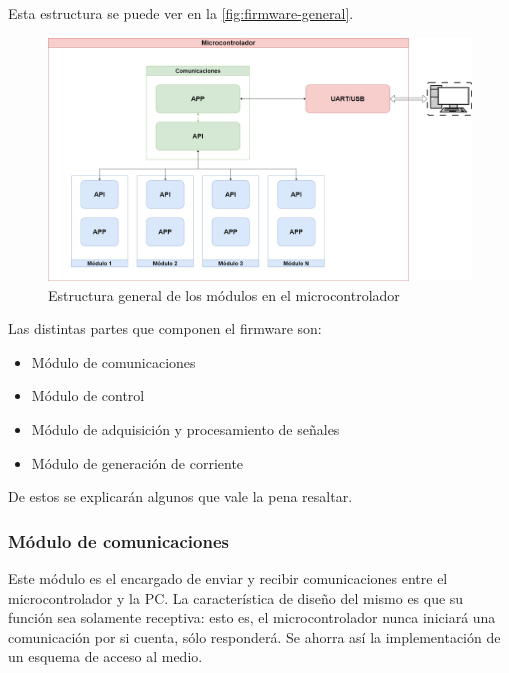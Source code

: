 \documentclass[titlepage, 12pt]{article}
\begin{document}
Esta estructura se puede ver en la \autoref{fig:firmware-general}.

    \begin{figure}[!htbp]
        \centering
        \includegraphics[scale=0.23]{diagrams/firmware-general.png}
        \caption{Estructura general de los módulos en el microcontrolador}
        \label{fig:firmware-general}
    \end{figure}


Las distintas partes que componen el firmware son:
    \begin{itemize}
        \item Módulo de comunicaciones
        \item Módulo de control
        \item Módulo de adquisición y procesamiento de señales
        \item Módulo de generación de corriente
    \end{itemize}

De estos se explicarán algunos que vale la pena resaltar.

\subsubsection{Módulo de comunicaciones}
Este módulo es el encargado de enviar y recibir comunicaciones entre el microcontrolador y la PC. La característica de diseño del mismo es que su función sea solamente receptiva: esto es, el microcontrolador nunca iniciará una comunicación por si cuenta, sólo responderá. Se ahorra así la implementación de un esquema de acceso al medio.
\end{document}
